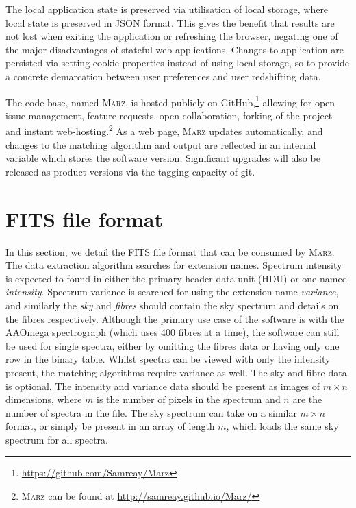 \documentclass[5p]{elsarticle}
\newcommand{\marz}{\textsc{Marz}}
\begin{document}
The local application state is preserved via utilisation of local storage, where local state is preserved in JSON format. This gives the benefit that results are not lost when exiting the application or refreshing the browser, negating one of the major disadvantages of stateful web applications. Changes to application are persisted via setting cookie properties instead of using local storage, so to provide a concrete demarcation between user preferences and user redshifting data.



The code base, named \marz{}, is hosted publicly on GitHub,\footnote{\url{https://github.com/Samreay/Marz}} allowing for open issue management, feature requests, open collaboration, forking of the project and instant web-hosting.\footnote{\marz{} can be found at \url{http://samreay.github.io/Marz/}} As a web page, \marz{} updates automatically, and changes to the matching algorithm and output are reflected in an internal variable which stores the software version. Significant upgrades will also be released as product versions via the tagging capacity of git.












\section{FITS file format} \label{sec:format}

In this section, we detail the FITS file format that can be consumed by \marz{}. The data extraction algorithm searches for extension names. Spectrum intensity is expected to found in either the primary header data unit (HDU) or one named \textit{intensity}. Spectrum variance is searched for using the extension name \textit{variance}, and similarly the \textit{sky} and \textit{fibres} should contain the sky spectrum and details on the fibres respectively. Although the primary use case of the software is with the AAOmega spectrograph (which uses 400 fibres at a time), the software can still be used for single spectra, either by omitting the fibres data or having only one row in the binary table. Whilst spectra can be viewed with only the intensity present, the matching algorithms require variance as well. The sky and fibre data is optional. The intensity and variance data should be present as images of $m\times n$ dimensions, where $m$ is the number of pixels in the spectrum and $n$ are the number of spectra in the file. The sky spectrum can take on a similar $m\times n$ format, or simply be present in an array of length $m$, which loads the same sky spectrum for all spectra.
\end{document}
